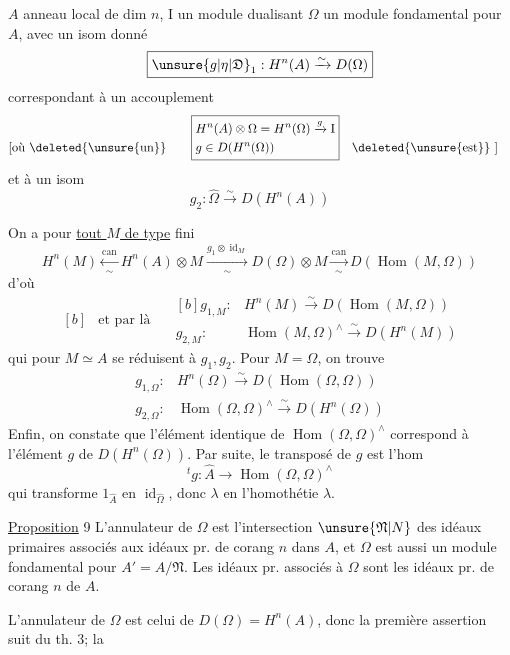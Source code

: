 $A$ anneau local de dim $n$, $\mathrm I$ un module dualisant
$\Omega$ un module fondamental pour $A$, avec un isom donné
\[
\boxed{\unsure{g|\eta|\mathfrak D}_1:H^n(A)\xrightarrow{\sim}D(\Omega)}
\]
correspondant à un accouplement
\[
\begin{aligned}[b]&\text{[où \deleted{\unsure{un}}}\end{aligned}\quad
\boxed{\begin{aligned}[b]
&H^n(A)\otimes\Omega=H^n(\Omega)\xrightarrow{g}\mathrm I\\
&g\in D(H^n(\Omega))
\end{aligned}}\quad\begin{aligned}[b]&\text{\deleted{\unsure{est}} ]}\end{aligned}
\]
et à un isom
\[
g_2:\widehat\Omega\xrightarrow{\sim}D(H^n(A))
\]

On a pour \uline{tout $M$ de type} fini
\[
\boxed{H^n(M)\xleftarrow[\sim]{\mathrm{can}}H^n(A)\otimes M}
\xrightarrow[\sim]{g_1\otimes\operatorname{id}_M}D(\Omega)\otimes M
\xrightarrow[\sim]{\mathrm{can}}D(\operatorname{Hom}(M,\Omega))
\]
d'où
\[
\begin{aligned}[b]&\text{et par là}\end{aligned}\quad
\boxed{\begin{aligned}[b]
g_{1,M}:{}&H^n(M)\xrightarrow{\sim}D(\operatorname{Hom}(M,\Omega))\\
g_{2,M}:{}&\operatorname{Hom}(M,\Omega)^{\wedge}\xrightarrow{\sim}D(H^n(M))
\end{aligned}}
\]
qui pour $M\simeq A$ se réduisent à $g_1,g_2$. Pour $M=\Omega$, on trouve
\[
\begin{aligned}
g_{1,\Omega}:{}&H^n(\Omega)\xrightarrow{\sim}D(\operatorname{Hom}(\Omega,\Omega))\\
g_{2,\Omega}:{}&\operatorname{Hom}(\Omega,\Omega)^{\wedge}\xrightarrow{\sim}D(H^n(\Omega))
\end{aligned}
\]
Enfin, on constate que l'élément identique de
$\operatorname{Hom}(\Omega,\Omega)^{\wedge}$ correspond à l'élément $g$ de $D(H^n(\Omega))$.
Par suite, le transposé de $g$ est l'hom
\[
{}^tg:\widehat A\longrightarrow\operatorname{Hom}(\Omega,\Omega)^{\wedge}
\]
qui transforme $1_{\widehat A}$ en $\operatorname{id}_{\widehat\Omega}$, donc $\lambda$ en l'homothétie $\lambda$.

\uline{Proposition} 9 L'annulateur de $\Omega$ est l'intersection $\unsure{\mathfrak N|N}$
des idéaux primaires associés aux idéaux pr. de
corang $n$ dans $A$, et $\Omega$ est aussi un
module fondamental pour $A'=A/\mathfrak N$. Les idéaux
pr. associés à $\Omega$ sont les idéaux pr. de corang $n$ de $A$. 

L'annulateur de $\Omega$ est celui de $D(\Omega)=H^n(A)$,
donc  la première assertion suit du th. 3; la

